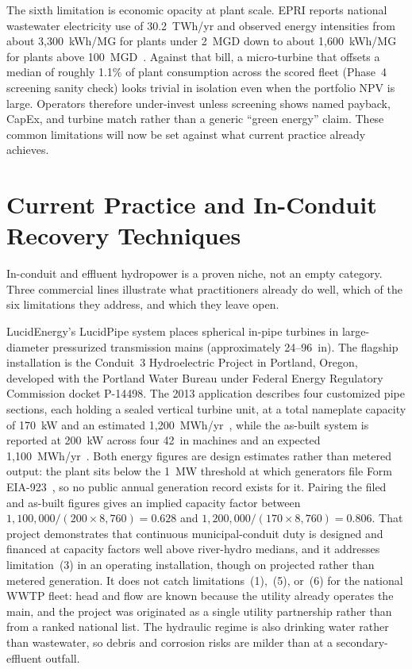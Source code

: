 \documentclass[12pt,letterpaper]{report}
\begin{document}
The sixth limitation is economic opacity at plant scale. EPRI reports national wastewater
electricity use of 30.2~TWh/yr and observed energy intensities from about 3,300~kWh/MG for
plants under 2~MGD down to about 1,600~kWh/MG for plants above 100~MGD~\cite{epri2013}.
Against that bill, a micro-turbine that offsets a median of roughly 1.1\% of plant
consumption across the scored fleet (Phase~4 screening sanity check) looks trivial in
isolation even when the
portfolio NPV is large. Operators therefore under-invest unless screening shows named
payback, CapEx, and turbine match rather than a generic ``green energy'' claim.
These common limitations will now be set against what current practice already achieves.

\section{Current Practice and In-Conduit Recovery Techniques}

In-conduit and effluent hydropower is a proven niche, not an empty category. Three
commercial lines illustrate what practitioners already do well, which of the six
limitations they address, and which they leave open.

LucidEnergy's LucidPipe system places spherical in-pipe turbines in large-diameter
pressurized transmission mains (approximately 24--96~in). The flagship installation is the
Conduit~3 Hydroelectric Project in Portland, Oregon, developed with the Portland Water
Bureau under Federal Energy Regulatory Commission docket P-14498. The 2013 application
describes four customized pipe sections, each holding a sealed vertical turbine unit, at a
total nameplate capacity of 170~kW and an estimated 1,200~MWh/yr~\cite{ferc_p14498}, while
the as-built system is reported at 200~kW across four 42~in machines and an expected
1,100~MWh/yr~\cite{lucidpipe}. Both energy figures are design estimates rather than metered
output: the plant sits below the 1~MW threshold at which generators file Form
EIA-923~\cite{eia923}, so no public annual generation record exists for it. Pairing the
filed and as-built figures gives an implied capacity factor between
$1{,}100{,}000/(200\times 8{,}760)=0.628$ and $1{,}200{,}000/(170\times 8{,}760)=0.806$.
That project demonstrates that continuous municipal-conduit duty is designed and financed
at capacity factors well above river-hydro medians, and it addresses limitation~(3) in an
operating installation, though on projected rather than metered generation. It does not catch limitations~(1),~(5), or~(6) for the national WWTP fleet: head and
flow are known because the utility already operates the main, and the project was
originated as a single utility partnership rather than from a ranked national list. The
hydraulic regime is also drinking water rather than wastewater, so debris and corrosion
risks are milder than at a secondary-effluent outfall.
\end{document}
